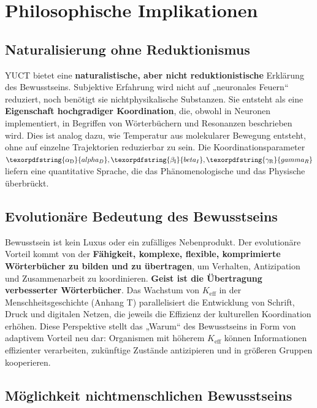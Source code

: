 \documentclass[12pt,a4paper]{article}
\DeclareRobustCommand{\alD}{\texorpdfstring{\ensuremath{\alpha_{\mathrm{D}}}}{alpha_D}}
\DeclareRobustCommand{\beI}{\texorpdfstring{\ensuremath{\beta_{\mathrm{I}}}}{beta_I}}
\DeclareRobustCommand{\gaR}{\texorpdfstring{\ensuremath{\gamma_{\mathrm{R}}}}{gamma_R}}
\newcommand{\eff}{\mathrm{eff}}
\newcommand{\Ke}{K_{\eff}}
\begin{document}
	\section{Philosophische Implikationen}
	
	\subsection{Naturalisierung ohne Reduktionismus}
	
	YUCT bietet eine \textbf{naturalistische, aber nicht reduktionistische} Erklärung des Bewusstseins. Subjektive Erfahrung wird nicht auf „neuronales Feuern“ reduziert, noch benötigt sie nichtphysikalische Substanzen. Sie entsteht als eine \textbf{Eigenschaft hochgradiger Koordination}, die, obwohl in Neuronen implementiert, in Begriffen von Wörterbüchern und Resonanzen beschrieben wird. Dies ist analog dazu, wie Temperatur aus molekularer Bewegung entsteht, ohne auf einzelne Trajektorien reduzierbar zu sein. Die Koordinationsparameter \(\alD, \beI, \gaR\) liefern eine quantitative Sprache, die das Phänomenologische und das Physische überbrückt.
	
	\subsection{Evolutionäre Bedeutung des Bewusstseins}
	
	Bewusstsein ist kein Luxus oder ein zufälliges Nebenprodukt. Der evolutionäre Vorteil kommt von der \textbf{Fähigkeit, komplexe, flexible, komprimierte Wörterbücher zu bilden und zu übertragen}, um Verhalten, Antizipation und Zusammenarbeit zu koordinieren. \textbf{Geist ist die Übertragung verbesserter Wörterbücher}. Das Wachstum von $\Ke$ in der Menschheitsgeschichte (Anhang T) parallelisiert die Entwicklung von Schrift, Druck und digitalen Netzen, die jeweils die Effizienz der kulturellen Koordination erhöhen. Diese Perspektive stellt das „Warum“ des Bewusstseins in Form von adaptivem Vorteil neu dar: Organismen mit höherem $\Ke$ können Informationen effizienter verarbeiten, zukünftige Zustände antizipieren und in größeren Gruppen kooperieren.
	
	\subsection{Möglichkeit nichtmenschlichen Bewusstseins}
	
\end{document}

